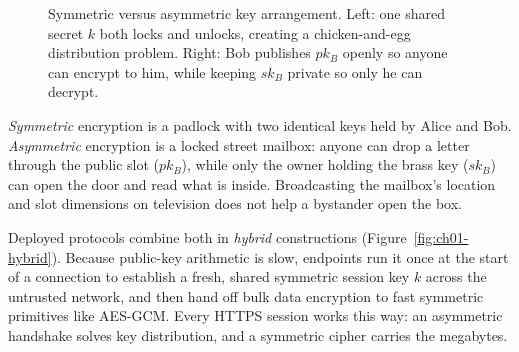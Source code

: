 \begin{figure}[htbp]
\caption{Symmetric versus asymmetric key arrangement. Left: one shared secret $k$ both locks and unlocks, creating a chicken-and-egg distribution problem. Right: Bob publishes $pk_B$ openly so anyone can encrypt to him, while keeping $sk_B$ private so only he can decrypt.}
\label{ch01:fig-sym-asym}
\end{figure}

\begin{intuitionbox}
\emph{Symmetric} encryption is a padlock with two identical keys held by Alice and Bob. \emph{Asymmetric} encryption is a locked street mailbox: anyone can drop a letter through the public slot ($pk_B$), while only the owner holding the brass key ($sk_B$) can open the door and read what is inside. Broadcasting the mailbox's location and slot dimensions on television does not help a bystander open the box.
\end{intuitionbox}

Deployed protocols combine both in \emph{hybrid} constructions (Figure~\ref{fig:ch01-hybrid}). Because public-key arithmetic is slow, endpoints run it once at the start of a connection to establish a fresh, shared symmetric session key $k$ across the untrusted network, and then hand off bulk data encryption to fast symmetric primitives like AES-GCM. Every HTTPS session works this way: an asymmetric handshake solves key distribution, and a symmetric cipher carries the megabytes.


